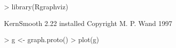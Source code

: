 \begin{Schunk}
\begin{Sinput}
> library(Rgraphviz)
\end{Sinput}
\begin{Soutput}
KernSmooth 2.22 installed
Copyright M. P. Wand 1997
\end{Soutput}
\begin{Sinput}
> g <- graph.proto()
> plot(g)
\end{Sinput}
\end{Schunk}
